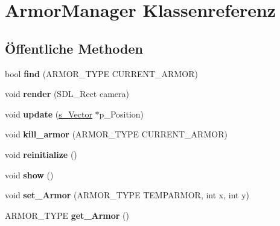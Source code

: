 \hypertarget{class_armor_manager}{\section{Armor\-Manager Klassenreferenz}
\label{class_armor_manager}
}
\subsection*{Öffentliche Methoden}
\begin{DoxyCompactItemize}
\item 
\hypertarget{class_armor_manager_ac5fa1487799e07ac40cdc4f44282c65e}{bool {\bfseries find} (A\-R\-M\-O\-R\-\_\-\-T\-Y\-P\-E C\-U\-R\-R\-E\-N\-T\-\_\-\-A\-R\-M\-O\-R)}\label{class_armor_manager_ac5fa1487799e07ac40cdc4f44282c65e}

\item 
\hypertarget{class_armor_manager_a79a20356f9630c6c51a816f0163b28bf}{void {\bfseries render} (S\-D\-L\-\_\-\-Rect camera)}\label{class_armor_manager_a79a20356f9630c6c51a816f0163b28bf}

\item 
\hypertarget{class_armor_manager_a6f608963c4a1efb31b2d658ee5246459}{void {\bfseries update} (\hyperlink{structs___vector}{s\-\_\-\-Vector} $\ast$p\-\_\-\-Position)}\label{class_armor_manager_a6f608963c4a1efb31b2d658ee5246459}

\item 
\hypertarget{class_armor_manager_a4ce4fd2a1570a917b844c740d3164325}{void {\bfseries kill\-\_\-armor} (A\-R\-M\-O\-R\-\_\-\-T\-Y\-P\-E C\-U\-R\-R\-E\-N\-T\-\_\-\-A\-R\-M\-O\-R)}\label{class_armor_manager_a4ce4fd2a1570a917b844c740d3164325}

\item 
\hypertarget{class_armor_manager_a9ee86635d7c7087cc59cb76cbc954d80}{void {\bfseries reinitialize} ()}\label{class_armor_manager_a9ee86635d7c7087cc59cb76cbc954d80}

\item 
\hypertarget{class_armor_manager_a67c0b4d0206bb0916dc2c6f8ca0ee225}{void {\bfseries show} ()}\label{class_armor_manager_a67c0b4d0206bb0916dc2c6f8ca0ee225}

\item 
\hypertarget{class_armor_manager_ae1d12bdafa1ec883841aa311307a3b85}{void {\bfseries set\-\_\-\-Armor} (A\-R\-M\-O\-R\-\_\-\-T\-Y\-P\-E T\-E\-M\-P\-A\-R\-M\-O\-R, int x, int y)}\label{class_armor_manager_ae1d12bdafa1ec883841aa311307a3b85}

\item 
\hypertarget{class_armor_manager_a08b4b1f42b418b09b6917767a3baae74}{A\-R\-M\-O\-R\-\_\-\-T\-Y\-P\-E {\bfseries get\-\_\-\-Armor} ()}\label{class_armor_manager_a08b4b1f42b418b09b6917767a3baae74}

\end{DoxyCompactItemize}
